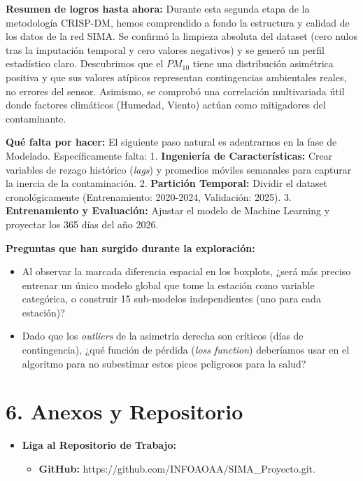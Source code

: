\documentclass[
  11pt,
  letterpaper,
]{article}
\providecommand{\tightlist}{%
  \setlength{\itemsep}{0pt}\setlength{\parskip}{0pt}}
\begin{document}
\textbf{Resumen de logros hasta ahora:} Durante esta segunda etapa de la
metodología CRISP-DM, hemos comprendido a fondo la estructura y calidad
de los datos de la red SIMA. Se confirmó la limpieza absoluta del
dataset (cero nulos tras la imputación temporal y cero valores
negativos) y se generó un perfil estadístico claro. Descubrimos que el
\(PM_{10}\) tiene una distribución asimétrica positiva y que sus valores
atípicos representan contingencias ambientales reales, no errores del
sensor. Asimismo, se comprobó una correlación multivariada útil donde
factores climáticos (Humedad, Viento) actúan como mitigadores del
contaminante.

\textbf{Qué falta por hacer:} El siguiente paso natural es adentrarnos
en la fase de Modelado. Específicamente falta: 1. \textbf{Ingeniería de
Características:} Crear variables de rezago histórico (\emph{lags}) y
promedios móviles semanales para capturar la inercia de la
contaminación. 2. \textbf{Partición Temporal:} Dividir el dataset
cronológicamente (Entrenamiento: 2020-2024, Validación: 2025). 3.
\textbf{Entrenamiento y Evaluación:} Ajustar el modelo de Machine
Learning y proyectar los 365 días del año 2026.

\textbf{Preguntas que han surgido durante la exploración:}

\begin{itemize}
\tightlist
\item
  Al observar la marcada diferencia espacial en los boxplots, ¿será más
  preciso entrenar un único modelo global que tome la estación como
  variable categórica, o construir 15 sub-modelos independientes (uno
  para cada estación)?
\item
  Dado que los \emph{outliers} de la asimetría derecha son críticos
  (días de contingencia), ¿qué función de pérdida (\emph{loss function})
  deberíamos usar en el algoritmo para no subestimar estos picos
  peligrosos para la salud?
\end{itemize}

\section{6. Anexos y Repositorio}\label{anexos-y-repositorio}

\begin{itemize}
\tightlist
\item
  \textbf{Liga al Repositorio de Trabajo:}

  \begin{itemize}
  \tightlist
  \item
    \textbf{GitHub:} https://github.com/INFOAOAA/SIMA\_Proyecto.git.
  \end{itemize}
\end{itemize}
\end{document}

